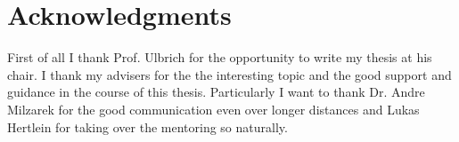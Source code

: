 \section*{Acknowledgments}

First of all I thank Prof. Ulbrich for the opportunity to write my thesis at his chair.
I thank my advisers for the the interesting topic and the good support and guidance in the course of this thesis. Particularly I want to thank Dr. Andre Milzarek for the good communication even over longer distances and Lukas Hertlein for taking over the mentoring so naturally.


\thispagestyle{empty}
